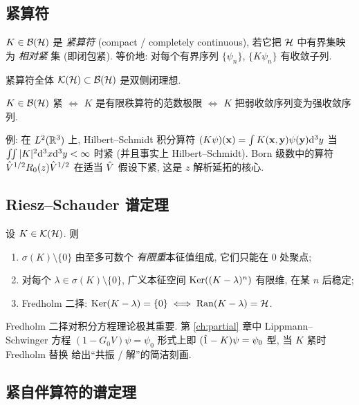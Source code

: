 \subsection{紧算符}

\begin{definition}[紧算符]\label{def:hilbert-compact}
$K\in\mathcal{B}(\mathcal{H})$ 是 \emph{紧算符} (compact / completely continuous), 若它把 $\mathcal{H}$ 中有界集映为 \emph{相对紧} 集 (即闭包紧). 等价地: 对每个有界序列 $\{\psi_n\}$, $\{K\psi_n\}$ 有收敛子列.

紧算符全体 $\mathcal{K}(\mathcal{H})\subset\mathcal{B}(\mathcal{H})$ 是双侧闭理想.
\end{definition}

\begin{theorem}[紧算符的等价描述]\label{thm:hilbert-compact-eq}
$K\in\mathcal{B}(\mathcal{H})$ 紧 $\iff$ $K$ 是有限秩算符的范数极限 $\iff$ $K$ 把弱收敛序列变为强收敛序列.
\end{theorem}

例: 在 $L^2(\mathbb{R}^3)$ 上, Hilbert--Schmidt 积分算符 $(K\psi)(\mathbf{x})=\int K(\mathbf{x},\mathbf{y})\psi(\mathbf{y})\mathrm{d}^3 y$ 当 $\iint|K|^2\mathrm{d}^3 x\mathrm{d}^3 y<\infty$ 时紧 (并且事实上 Hilbert--Schmidt). Born 级数中的算符 $\hat{V}^{1/2}R_0(z)\hat{V}^{1/2}$ 在适当 $\hat{V}$ 假设下紧, 这是 $z$ 解析延拓的核心.

\subsection{Riesz--Schauder 谱定理}

\begin{theorem}\label{thm:hilbert-riesz-schauder}
设 $K\in\mathcal{K}(\mathcal{H})$. 则
\begin{enumerate}
    \item $\sigma(K)\setminus\{0\}$ 由至多可数个 \emph{有限重}本征值组成, 它们只能在 $0$ 处聚点;
    \item 对每个 $\lambda\in\sigma(K)\setminus\{0\}$, 广义本征空间 $\operatorname{Ker}((K-\lambda)^n)$ 有限维, 在某 $n$ 后稳定;
    \item Fredholm 二择: $\operatorname{Ker}(K-\lambda)=\{0\}\iff\operatorname{Ran}(K-\lambda)=\mathcal{H}$.
\end{enumerate}
\end{theorem}

Fredholm 二择对积分方程理论极其重要. 第 \ref{ch:partial} 章中 Lippmann--Schwinger 方程 $(1-G_0V)\psi=\psi_0$ 形式上即 $(\hat{1}-K)\psi=\psi_0$ 型, 当 $K$ 紧时 Fredholm 替换 给出``共振 / 解''的简洁刻画.

\subsection{紧自伴算符的谱定理}

